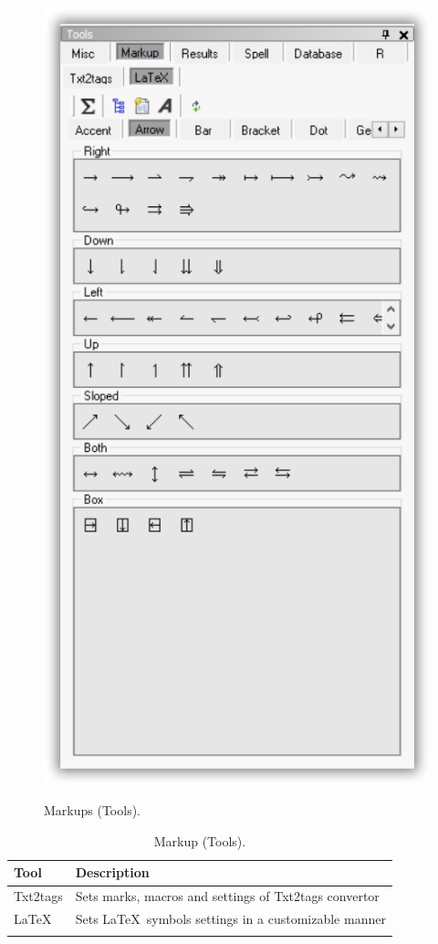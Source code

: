 \begin{figure}[H]
  \includegraphics[scale=0.35]{./res/tools_markup_latex_arrows.png}\\
  \caption{Markups (Tools).}
  \label{fig:tools_markup_txt2tags_options}
\end{figure}

\begin{table}
  \begin{footnotesize}
    \begin{tabularx}{\textwidth}{lX}\\
      \hline
      \textbf{Tool} & \textbf{Description} \\
      \hline
      Txt2tags & Sets marks, macros and settings of Txt2tags convertor \\
      \LaTeX & Sets \LaTeX~symbols settings in a customizable manner \\
      \hline
      \\
    \end{tabularx}
  \end{footnotesize}
  \caption{Markup (Tools).}
  \label{tab:tools_markup}
\end{table}

